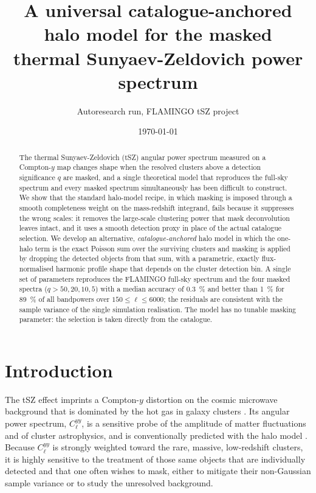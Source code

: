 \documentclass[twocolumn,10pt]{article}
\title{\bf A universal catalogue-anchored halo model for the masked\\
thermal Sunyaev-Zeldovich power spectrum}
\author{\normalsize Autoresearch run, FLAMINGO tSZ project}
\date{\normalsize \today}
\newcommand{\Cl}{C_\ell}
\begin{document}
\maketitle

\begin{abstract}
\noindent
The thermal Sunyaev-Zeldovich (tSZ) angular power spectrum measured on a
Compton-$y$ map changes shape when the resolved clusters above a detection
significance $q$ are masked, and a single theoretical model that reproduces the
full-sky spectrum and every masked spectrum simultaneously has been difficult to
construct. We show that the standard halo-model recipe, in which masking is
imposed through a smooth completeness weight on the mass-redshift integrand,
fails because it suppresses the wrong scales: it removes the large-scale
clustering power that mask deconvolution leaves intact, and it uses a smooth
detection proxy in place of the actual catalogue selection. We develop an
alternative, \emph{catalogue-anchored} halo model in which the one-halo term is
the exact Poisson sum over the surviving clusters and masking is applied by
dropping the detected objects from that sum, with a parametric, exactly
flux-normalised harmonic profile shape that depends on the cluster detection bin.
A single set of parameters reproduces the FLAMINGO full-sky spectrum and the four
masked spectra ($q>50,20,10,5$) with a median accuracy of \SI{0.3}{\percent} and
better than \SI{1}{\percent} for \SI{89}{\percent} of all bandpowers over
$150\le\ell\le6000$; the residuals are consistent with the sample variance of the
single simulation realisation. The model has no tunable masking parameter: the
selection is taken directly from the catalogue.
\end{abstract}

\section{Introduction}
The tSZ effect imprints a Compton-$y$ distortion on the cosmic microwave
background that is dominated by the hot gas in galaxy clusters
\citep{SunyaevZeldovich1972}. Its angular power spectrum, $\Cl^{yy}$, is a
sensitive probe of the amplitude of matter fluctuations and of cluster
astrophysics, and is conventionally predicted with the halo model
\citep{KomatsuSeljak2002,Bolliet2018}. Because $\Cl^{yy}$ is strongly weighted
toward the rare, massive, low-redshift clusters, it is highly sensitive to the
treatment of those same objects that are individually detected and that one often
wishes to mask, either to mitigate their non-Gaussian sample variance or to study
the unresolved background.
\end{document}
